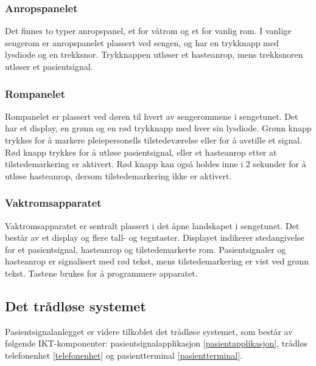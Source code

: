 \subsubsection{Anropspanelet}
Det finnes to typer anropspanel, et for våtrom og et for vanlig rom. I vanlige sengerom er anropspanelet plassert ved sengen, og har en trykknapp med lysdiode og en trekksnor.
Trykknappen utløser et hasteanrop, mens trekksnoren utløser et pasientsignal.

\subsubsection{Rompanelet}
Rompanelet er plassert ved døren til hvert av sengerommene i sengetunet. Det har et display, en grønn og en rød trykknapp med hver sin lysdiode. Grønn knapp trykkes for å markere pleiepersonells tilstedeværelse eller for å avstille et signal. Rød knapp trykkes for å utløse pasientsignal, eller et hasteanrop etter at tilstedemarkering er aktivert. Rød knapp kan også holdes inne i 2 sekunder for å utløse hasteanrop, dersom tilstedemarkering ikke er aktivert. 

\subsubsection{Vaktromsapparatet}
Vaktromsapparatet er sentralt plassert i det åpne landskapet i sengetunet. Det består av et display og flere tall- og tegntaster. Displayet indikerer stedangivelse for et pasientsignal, hasteanrop og tilstedemarkerte rom. Pasientsignaler og hasteanrop er signalisert med rød tekst, mens tilstedemarkering er vist ved grønn tekst. Tastene brukes for å programmere apparatet.

\subsection{Det trådløse systemet}
Pasientsignalanlegget er videre tilkoblet det trådløse systemet, som består av følgende IKT-komponenter: pasientsignalapplikasjon \ref{pasientapplikasjon}, trådløs telefonenhet \ref{telefonenhet} og pasientterminal \ref{pasientterminal}.

